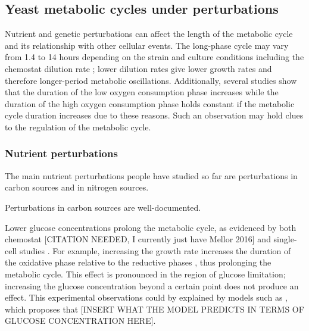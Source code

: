 \subsection{Yeast metabolic cycles under perturbations}
\label{subsec:intro-ymc-perturbations}

Nutrient and genetic perturbations can affect the length of the metabolic cycle and its relationship with other cellular events.
The long-phase cycle may vary from 1.4 to 14 hours depending on the strain and culture conditions including the chemostat dilution rate \citep{caustonMetabolicRhythmsFramework2018};
lower dilution rates give lower growth rates and therefore longer-period metabolic oscillations.
Additionally, several studies \citep{slavovCouplingGrowthRate2011, oneillEukaryoticCellBiology2020} show that the duration of the low oxygen consumption phase increases while the duration of the high oxygen consumption phase holds constant if the metabolic cycle duration increases due to these reasons.
Such an observation may hold clues to the regulation of the metabolic cycle.

\subsubsection{Nutrient perturbations}
\label{subsubsec:intro-ymc-perturbations-nutrient}

The main nutrient perturbations people have studied so far are perturbations in carbon sources and in nitrogen sources.

Perturbations in carbon sources are well-documented.

Lower glucose concentrations prolong the metabolic cycle, as evidenced by both chemostat [CITATION NEEDED, I currently just have Mellor 2016] and single-cell studies \parencite{papagiannakisAutonomousMetabolicOscillations2017}.
For example, increasing the growth rate increases the duration of the oxidative phase relative to the reductive phases \citep{slavovCouplingGrowthRate2011}, thus prolonging the metabolic cycle.
This effect is pronounced in the region of glucose limitation;
increasing the glucose concentration beyond a certain point does not produce an effect.
This experimental observations could by explained by models such as \textcite{jonesCyberneticModelGrowth1999}, which proposes that [INSERT WHAT THE MODEL PREDICTS IN TERMS OF GLUCOSE CONCENTRATION HERE].

